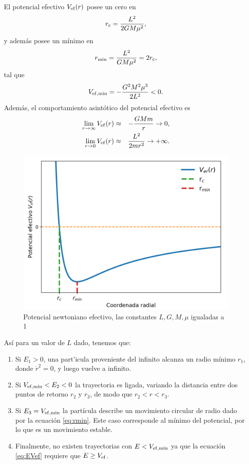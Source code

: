     El potencial efectivo $V_{\rm ef}(r)$ posee un cero en
\begin{eqnarray}
    r_{\rm c}=\frac{L^2}{2GM\mu^2} ,\label{eq:cero1}
\end{eqnarray}
y además posee un mínimo en
\begin{eqnarray}
r_{\rm min}=\frac{L^2}{GM\mu^2}=2r_{\rm c},\label{eq:rmin}
\end{eqnarray}
tal que
\begin{eqnarray*}
V_{\rm ef, min}=-\frac{G^2M^2\mu^3}{2L^2}<0.
\end{eqnarray*}
Además, el comportamiento asintótico del potencial efectivo es
\begin{eqnarray*}
\lim_{r\to\infty}V_{\rm ef}(r)&\approx&-\frac{GMm}{r}\rightarrow 0,\\
\lim_{r\to 0}V_{\rm ef}(r)&\approx&\frac{L^2}{2mr^2}\rightarrow +\infty .
\end{eqnarray*}
\begin{figure}[H]
    \centering
    \includegraphics[scale=0.6]{images/Pot_efe.png}
    \caption{Potencial newtoniano efectivo, las constantes $L,G,M,\mu$ igualadas a 1}
\end{figure}
Así para un valor de $L$ dado, tenemos que:
\begin{enumerate}
    \item Si $E_1>0$, una part'icula proveniente del infinito alcanza un radio
    mínimo $r_1$, donde $\dot{r}^2=0$, y luego vuelve a infinito.
    \item Si $V_{\rm ef, min}<E_2<0$ la trayectoria es ligada, variando la distancia entre dos puntos de retorno $r_2$ y $r_3$, de modo que $r_2<r<r_{3}$.
    \item Si $E_{3}=V_{\rm ef, min}$ la partícula
    describe un movimiento circular de radio dado por la ecuación \ref{eq:rmin}. Este caso
    corresponde al mínimo del potencial, por lo que es un
    movimiento estable.
    \item Finalmente, no existen trayectorias con $E<V_{\rm ef, min}$ ya que la ecuación \ref{eq:EVef} requiere que $E\ge V_{\rm ef}$.
\end{enumerate}
